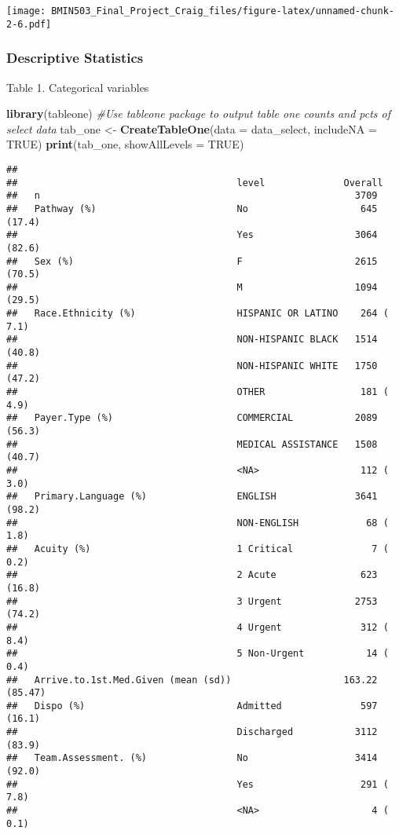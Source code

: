 \documentclass[]{article}
\newenvironment{Shaded}{\begin{snugshade}}{\end{snugshade}}
\newcommand{\KeywordTok}[1]{\textcolor[rgb]{0.13,0.29,0.53}{\textbf{#1}}}
\newcommand{\DataTypeTok}[1]{\textcolor[rgb]{0.13,0.29,0.53}{#1}}
\newcommand{\StringTok}[1]{\textcolor[rgb]{0.31,0.60,0.02}{#1}}
\newcommand{\CommentTok}[1]{\textcolor[rgb]{0.56,0.35,0.01}{\textit{#1}}}
\newcommand{\OtherTok}[1]{\textcolor[rgb]{0.56,0.35,0.01}{#1}}
\newcommand{\NormalTok}[1]{#1}
\begin{document}
\texttt{[image: BMIN503\_Final\_Project\_Craig\_files/figure-latex/unnamed-chunk-2-6.pdf]}

\subsubsection{Descriptive Statistics}\label{descriptive-statistics}

Table 1. Categorical variables

\begin{Shaded}
\begin{Highlighting}[]
\KeywordTok{library}\NormalTok{(tableone) }\CommentTok{#Use tableone package to output table one counts and pcts of select data}
\NormalTok{tab_one <-}\StringTok{ }\KeywordTok{CreateTableOne}\NormalTok{(}\DataTypeTok{data =}\NormalTok{ data_select, }\DataTypeTok{includeNA =} \OtherTok{TRUE}\NormalTok{)}
\KeywordTok{print}\NormalTok{(tab_one, }\DataTypeTok{showAllLevels =} \OtherTok{TRUE}\NormalTok{)}
\end{Highlighting}
\end{Shaded}

\begin{verbatim}
##                                      
##                                       level              Overall       
##   n                                                        3709        
##   Pathway (%)                         No                    645 (17.4) 
##                                       Yes                  3064 (82.6) 
##   Sex (%)                             F                    2615 (70.5) 
##                                       M                    1094 (29.5) 
##   Race.Ethnicity (%)                  HISPANIC OR LATINO    264 ( 7.1) 
##                                       NON-HISPANIC BLACK   1514 (40.8) 
##                                       NON-HISPANIC WHITE   1750 (47.2) 
##                                       OTHER                 181 ( 4.9) 
##   Payer.Type (%)                      COMMERCIAL           2089 (56.3) 
##                                       MEDICAL ASSISTANCE   1508 (40.7) 
##                                       <NA>                  112 ( 3.0) 
##   Primary.Language (%)                ENGLISH              3641 (98.2) 
##                                       NON-ENGLISH            68 ( 1.8) 
##   Acuity (%)                          1 Critical              7 ( 0.2) 
##                                       2 Acute               623 (16.8) 
##                                       3 Urgent             2753 (74.2) 
##                                       4 Urgent              312 ( 8.4) 
##                                       5 Non-Urgent           14 ( 0.4) 
##   Arrive.to.1st.Med.Given (mean (sd))                    163.22 (85.47)
##   Dispo (%)                           Admitted              597 (16.1) 
##                                       Discharged           3112 (83.9) 
##   Team.Assessment. (%)                No                   3414 (92.0) 
##                                       Yes                   291 ( 7.8) 
##                                       <NA>                    4 ( 0.1)
\end{verbatim}
\end{document}
